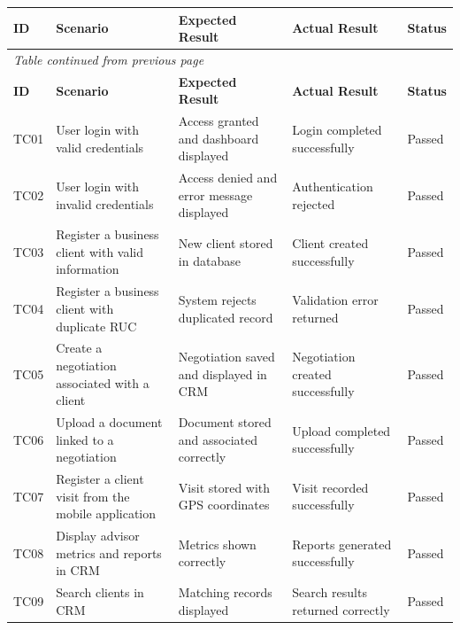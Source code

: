 \documentclass[letterpaper%
, oneside%
, 12pt%
, memoireprojet%
, english%
,creativecommons,hyperref, withAlgo2e %
]{thETS}
\begin{document}
\begingroup
\setlength{\LTleft}{-0.5cm plus -1fill}
\setlength{\LTright}{\LTleft}
\begin{longtable}{|p{1.0cm}|p{4.8cm}|p{3.3cm}|p{2.8cm}|p{1.3cm}|}
\hline
\textbf{ID} & \textbf{Scenario} & \textbf{Expected Result} & \textbf{Actual Result} & \textbf{Status} \\ \hline
\endfirsthead
\multicolumn{5}{l}{\textit{Table continued from previous page}} \\ \hline
\textbf{ID} & \textbf{Scenario} & \textbf{Expected Result} & \textbf{Actual Result} & \textbf{Status} \\ \hline
\endhead

TC01 & User login with valid credentials & Access granted and dashboard displayed & Login completed successfully & Passed \\ \hline

TC02 & User login with invalid credentials & Access denied and error message displayed & Authentication rejected & Passed \\ \hline

TC03 & Register a business client with valid information & New client stored in database & Client created successfully & Passed \\ \hline

TC04 & Register a business client with duplicate RUC & System rejects duplicated record & Validation error returned & Passed \\ \hline

TC05 & Create a negotiation associated with a client & Negotiation saved and displayed in CRM & Negotiation created successfully & Passed \\ \hline

TC06 & Upload a document linked to a negotiation & Document stored and associated correctly & Upload completed successfully & Passed \\ \hline

TC07 & Register a client visit from the mobile application & Visit stored with GPS coordinates & Visit recorded successfully & Passed \\ \hline

TC08 & Display advisor metrics and reports in CRM & Metrics shown correctly & Reports generated successfully & Passed \\ \hline

TC09 & Search clients in CRM & Matching records displayed & Search results returned correctly & Passed \\ \hline


\end{longtable}
\end{document}
